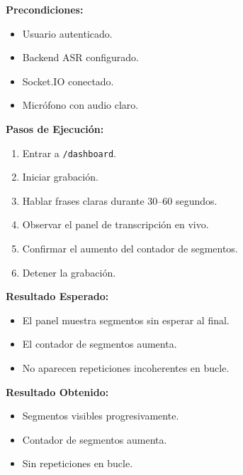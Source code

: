 \documentclass[12pt, a4paper]{article}
\newcommand{\prioChip}[2]{%
  \colorbox{#1}{\textcolor{white}{\footnotesize\textbf{#2}}}%
}
\newcommand{\statusChip}[2]{%
  \colorbox{#1}{\textcolor{white}{\footnotesize\textbf{#2}}}%
}
\begin{document}
\newpage

\begin{tcolorbox}[enhanced, breakable, colback=white, colframe=critica,
  boxrule=1.5pt, arc=5pt,
  title={\textbf{CP-04} \enspace Transcripci\'on en vivo \hfill \prioChip{critica}{Cr\'itica} \enspace \statusChip{paso-green}{PASO}},
  fonttitle=\color{white},
  attach boxed title to top left={yshift=-2mm,xshift=4mm},
  boxed title style={colback=critica,arc=3pt}]
\begin{minipage}[t]{0.48\linewidth}
\textbf{Precondiciones:}
\begin{itemize}[noitemsep,topsep=2pt]
  \item Usuario autenticado.
  \item Backend ASR configurado.
  \item Socket.IO conectado.
  \item Micr\'ofono con audio claro.
\end{itemize}
\textbf{Pasos de Ejecuci\'on:}
\begin{enumerate}[noitemsep,topsep=2pt]
  \item Entrar a \texttt{/dashboard}.
  \item Iniciar grabaci\'on.
  \item Hablar frases claras durante 30--60 segundos.
  \item Observar el panel de transcripci\'on en vivo.
  \item Confirmar el aumento del contador de segmentos.
  \item Detener la grabaci\'on.
\end{enumerate}
\end{minipage}\hfill
\begin{minipage}[t]{0.48\linewidth}
\textbf{Resultado Esperado:}
\begin{itemize}[noitemsep,topsep=2pt]
  \item El panel muestra segmentos sin esperar al final.
  \item El contador de segmentos aumenta.
  \item No aparecen repeticiones incoherentes en bucle.
\end{itemize}
\vspace{4pt}
\textbf{Resultado Obtenido:}
\begin{itemize}[noitemsep,topsep=2pt]
  \item[$\checkmark$] Segmentos visibles progresivamente.
  \item[$\checkmark$] Contador de segmentos aumenta.
  \item[$\checkmark$] Sin repeticiones en bucle.
\end{itemize}
\end{minipage}
\end{tcolorbox}
\end{document}
